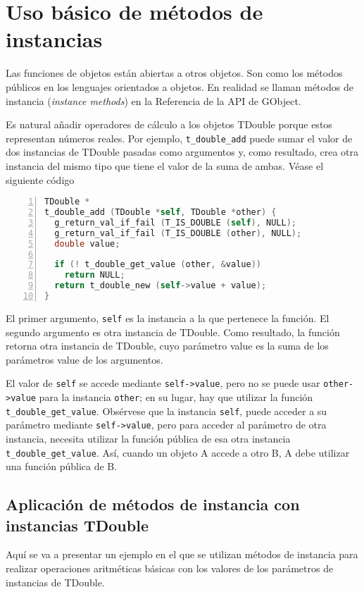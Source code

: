 \section{Uso básico de métodos de instancias}
Las funciones de objetos están abiertas a otros objetos. Son como los métodos públicos en los lenguajes
orientados a objetos.
En realidad se llaman métodos de instancia (\emph{instance methods}) en la Referencia de la API de GObject.

Es natural añadir operadores de cálculo a los objetos \textsf{TDouble} porque estos representan números
reales. Por ejemplo, \texttt{t\_double\_add} puede sumar el valor de dos instancias de \textsf{TDouble}
pasadas como argumentos y, como resultado, crea otra instancia del mismo tipo que tiene el valor de la
suma de ambas. Véase  el siguiente código
\begin{lstlisting}[language=C, numbers=left]
TDouble *
t_double_add (TDouble *self, TDouble *other) {
  g_return_val_if_fail (T_IS_DOUBLE (self), NULL);
  g_return_val_if_fail (T_IS_DOUBLE (other), NULL);
  double value;

  if (! t_double_get_value (other, &value))
    return NULL;
  return t_double_new (self->value + value);
}
\end{lstlisting}
El primer argumento, \texttt{self} es la instancia a la que pertenece la función. El segundo argumento es otra
instancia de \textsf{TDouble}. Como resultado, la función retorna otra instancia de \textsf{TDouble}, cuyo
parámetro \textsf{value} es la suma de los parámetros \textsf{value} de los argumentos.

El valor de \texttt{self} se accede mediante \texttt{self->value}, pero no se puede usar \texttt{other->value}
para la instancia \texttt{other}; en su lugar, hay que utilizar la función \texttt{t\_double\_get\_value}.
Obsérvese que la instancia \texttt{self}, puede acceder a su parámetro mediante \texttt{self->value},
pero para acceder al parámetro de otra instancia, necesita utilizar la función pública de esa otra
instancia \texttt{t\_double\_get\_value}. Así, cuando un objeto A accede a otro B, A debe utilizar una
función pública de B.

\subsection{Aplicación de métodos de instancia con instancias \textsf{TDouble}}
Aquí se va a presentar un ejemplo en el que se utilizan métodos de instancia para realizar
operaciones aritméticas básicas con los valores de los parámetros de instancias de \textsf{TDouble}.

